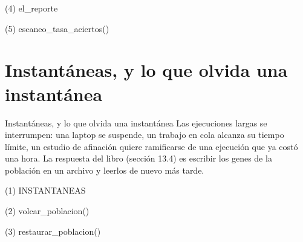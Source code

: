 \begin{frame}[fragile]{(4) el\_reporte}

\end{frame}

\begin{frame}[fragile]{(5) escaneo\_tasa\_aciertos()}

\end{frame}


\section{Instantáneas, y lo que olvida una instantánea}

\begin{frame}{Instantáneas, y lo que olvida una instantánea}
Las ejecuciones largas se interrumpen: una laptop se suspende, un trabajo en cola alcanza su tiempo límite, un
estudio de afinación quiere ramificarse de una ejecución que ya costó una hora. La respuesta del libro
(sección 13.4) es escribir los genes de la población en un archivo y leerlos
de nuevo más tarde.
\end{frame}

\begin{frame}[fragile]{(1) INSTANTANEAS}

\end{frame}

\begin{frame}[fragile]{(2) volcar\_poblacion()}

\end{frame}

\begin{frame}[fragile]{(3) restaurar\_poblacion()}

\end{frame}

